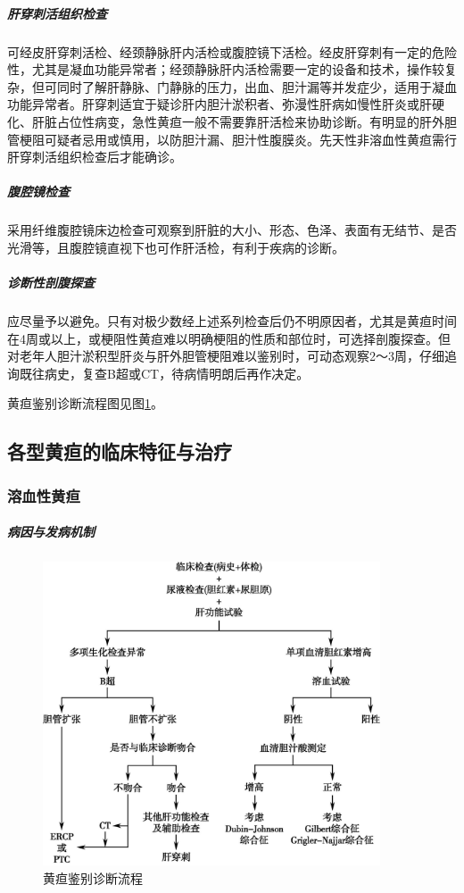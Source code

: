 \subparagraph{肝穿刺活组织检查}

可经皮肝穿刺活检、经颈静脉肝内活检或腹腔镜下活检。经皮肝穿刺有一定的危险性，尤其是凝血功能异常者；经颈静脉肝内活检需要一定的设备和技术，操作较复杂，但可同时了解肝静脉、门静脉的压力，出血、胆汁漏等并发症少，适用于凝血功能异常者。肝穿刺适宜于疑诊肝内胆汁淤积者、弥漫性肝病如慢性肝炎或肝硬化、肝脏占位性病变，急性黄疸一般不需要靠肝活检来协助诊断。有明显的肝外胆管梗阻可疑者忌用或慎用，以防胆汁漏、胆汁性腹膜炎。先天性非溶血性黄疸需行肝穿刺活组织检查后才能确诊。

\subparagraph{腹腔镜检查}

采用纤维腹腔镜床边检查可观察到肝脏的大小、形态、色泽、表面有无结节、是否光滑等，且腹腔镜直视下也可作肝活检，有利于疾病的诊断。

\subparagraph{诊断性剖腹探查}

应尽量予以避免。只有对极少数经上述系列检查后仍不明原因者，尤其是黄疸时间在4周或以上，或梗阻性黄疸难以明确梗阻的性质和部位时，可选择剖腹探查。但对老年人胆汁淤积型肝炎与肝外胆管梗阻难以鉴别时，可动态观察2～3周，仔细追询既往病史，复查B超或CT，待病情明朗后再作决定。

黄疸鉴别诊断流程图见图\ref{fig16-1}。

\subsection{各型黄疸的临床特征与治疗}

\subsubsection{溶血性黄疸}

\subparagraph{病因与发病机制}

\begin{figure}[!htbp]
 \centering
 \includegraphics[width=3.9375in,height=3.54167in]{./images/Image00062.jpg}
 \captionsetup{justification=centering}
 \caption{黄疸鉴别诊断流程}
 \label{fig16-1}
  \end{figure} 


